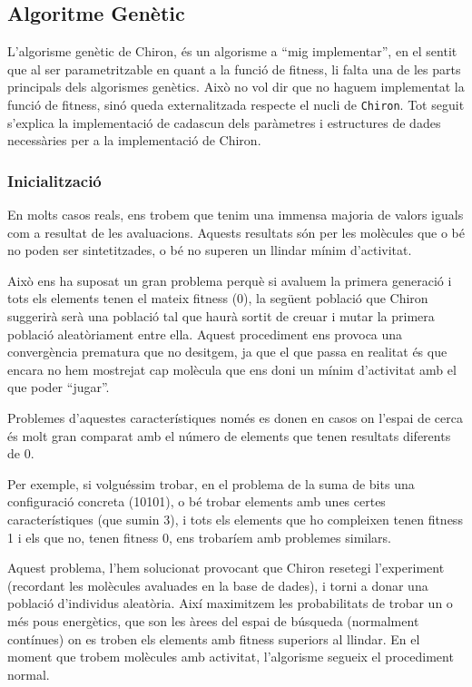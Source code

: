 
\subsection{Algoritme Genètic} %
	\label{sub:Algoritme Genetic}

L'algorisme genètic de Chiron, és un algorisme a ``mig implementar'', en el
sentit que  al ser parametritzable en quant a la funció de fitness, li falta una
de les parts principals dels algorismes genètics.  Això no vol dir que no haguem
implementat la funció de fitness, sinó queda externalitzada respecte el nucli de
\texttt{Chiron}.  Tot seguit s'explica la implementació de cadascun dels
paràmetres i estructures de dades necessàries per a la implementació de Chiron.

\subsubsection{Inicialització} %
\label{ssub:CInicialitzacio}

En  molts casos reals, ens trobem que tenim una immensa majoria de valors iguals
com a resultat de les avaluacions.  Aquests resultats són per les molècules que
o bé no poden ser sintetitzades, o bé no superen un llindar mínim d'activitat.

Això ens ha suposat un gran problema perquè si avaluem la primera generació i
tots els elements tenen el mateix fitness (0), la següent població que Chiron
suggerirà serà una població tal que haurà sortit de creuar i mutar la primera
població aleatòriament entre ella.  Aquest procediment ens provoca una
convergència prematura que no desitgem, ja que el que passa en realitat és que
encara no hem mostrejat cap molècula que ens doni un mínim d'activitat amb el
que poder ``jugar''.

Problemes d'aquestes característiques només es donen en casos on l'espai de
cerca és molt gran comparat amb el número de elements que tenen resultats
diferents de 0.

Per exemple, si volguéssim trobar, en el problema de la suma de bits una
configuració concreta (10101), o bé trobar elements amb unes certes
característiques (que sumin 3), i tots els elements que ho compleixen tenen
fitness 1 i els que no, tenen fitness 0, ens trobaríem amb problemes similars.

Aquest problema, l'hem solucionat provocant que Chiron resetegi l'experiment
(recordant les molècules avaluades en la base de dades), i torni a donar una
població d'individus aleatòria.  Així maximitzem les probabilitats de trobar un
o més pous energètics, que son les àrees del espai de búsqueda (normalment
contínues) on es troben els elements amb fitness superiors al llindar.  En el
moment que trobem molècules amb activitat, l'algorisme segueix el procediment
normal.

